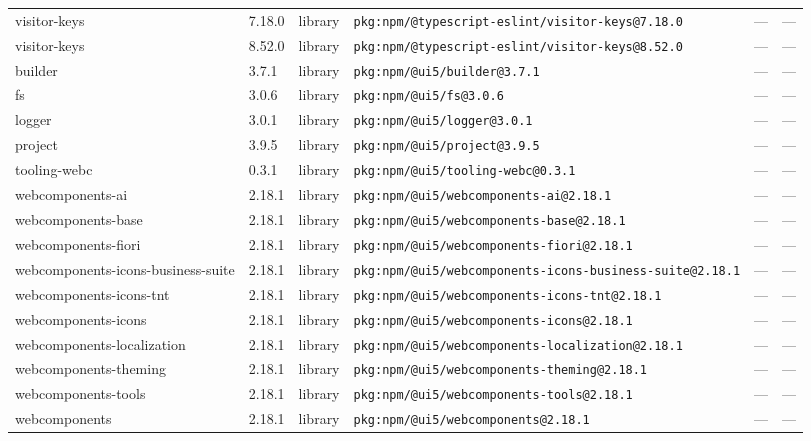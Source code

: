 \documentclass[11pt,a4paper]{article}
\begin{document}
\begin{longtable}{|p{4cm}|p{2cm}|p{1.6cm}|p{5cm}|p{1.5cm}|p{3.5cm}|}
\raggedright visitor-keys & 7.18.0 & library & \small\texttt{pkg:npm/@typescript-eslint/visitor-keys@7.18.0} & — & \small — \\
\raggedright visitor-keys & 8.52.0 & library & \small\texttt{pkg:npm/@typescript-eslint/visitor-keys@8.52.0} & — & \small — \\
\raggedright builder & 3.7.1 & library & \small\texttt{pkg:npm/@ui5/builder@3.7.1} & — & \small — \\
\raggedright fs & 3.0.6 & library & \small\texttt{pkg:npm/@ui5/fs@3.0.6} & — & \small — \\
\raggedright logger & 3.0.1 & library & \small\texttt{pkg:npm/@ui5/logger@3.0.1} & — & \small — \\
\raggedright project & 3.9.5 & library & \small\texttt{pkg:npm/@ui5/project@3.9.5} & — & \small — \\
\raggedright tooling-webc & 0.3.1 & library & \small\texttt{pkg:npm/@ui5/tooling-webc@0.3.1} & — & \small — \\
\raggedright webcomponents-ai & 2.18.1 & library & \small\texttt{pkg:npm/@ui5/webcomponents-ai@2.18.1} & — & \small — \\
\raggedright webcomponents-base & 2.18.1 & library & \small\texttt{pkg:npm/@ui5/webcomponents-base@2.18.1} & — & \small — \\
\raggedright webcomponents-fiori & 2.18.1 & library & \small\texttt{pkg:npm/@ui5/webcomponents-fiori@2.18.1} & — & \small — \\
\raggedright webcomponents-icons-business-suite & 2.18.1 & library & \small\texttt{pkg:npm/@ui5/webcomponents-icons-business-suite@2.18.1} & — & \small — \\
\raggedright webcomponents-icons-tnt & 2.18.1 & library & \small\texttt{pkg:npm/@ui5/webcomponents-icons-tnt@2.18.1} & — & \small — \\
\raggedright webcomponents-icons & 2.18.1 & library & \small\texttt{pkg:npm/@ui5/webcomponents-icons@2.18.1} & — & \small — \\
\raggedright webcomponents-localization & 2.18.1 & library & \small\texttt{pkg:npm/@ui5/webcomponents-localization@2.18.1} & — & \small — \\
\raggedright webcomponents-theming & 2.18.1 & library & \small\texttt{pkg:npm/@ui5/webcomponents-theming@2.18.1} & — & \small — \\
\raggedright webcomponents-tools & 2.18.1 & library & \small\texttt{pkg:npm/@ui5/webcomponents-tools@2.18.1} & — & \small — \\
\raggedright webcomponents & 2.18.1 & library & \small\texttt{pkg:npm/@ui5/webcomponents@2.18.1} & — & \small — \\

\end{longtable}
\end{document}
